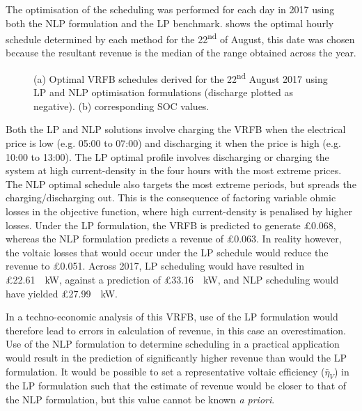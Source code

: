 \documentclass[preprint,3p,review,authoryear,10pt]{elsarticle}
\begin{document}
The optimisation of the scheduling was performed for each day in 2017 using both the NLP formulation and the LP benchmark.  shows the optimal hourly schedule determined by each method for the 22\textsuperscript{nd} of August, this date was chosen because the resultant revenue is the median of the range obtained across the year.

\begin{figure}[!ht]
\centering
{}
\caption{(a) Optimal VRFB schedules derived for the 22\textsuperscript{nd} August 2017 using LP and NLP optimisation formulations (discharge plotted as negative). (b) corresponding SOC values.}
\end{figure}

Both the LP and NLP solutions involve charging the VRFB when the electrical price is low (e.g. 05:00 to 07:00) and discharging it when the price is high (e.g. 10:00 to 13:00). The LP optimal profile involves discharging or charging the system at high current-density in the four hours with the most extreme prices. The NLP optimal schedule also targets the most extreme periods, but spreads the charging/discharging out. This is the consequence of factoring variable ohmic losses in the objective function, where high current-density is penalised by higher losses. Under the LP formulation, the VRFB is predicted to generate \pounds 0.068, whereas the NLP formulation predicts a revenue of \pounds 0.063. In reality however, the voltaic losses that would occur under the LP schedule would reduce the revenue to \pounds 0.051. Across 2017, LP scheduling would have resulted in \pounds \SI{22.61}{\per\kilo\watt}, against a prediction of \pounds \SI{33.16}{\per\kilo\watt}, and NLP scheduling would have yielded \pounds \SI{27.99}{\per\kilo\watt}.

In a techno-economic analysis of this VRFB, use of the LP formulation would therefore lead to errors in calculation of revenue, in this case an overestimation. Use of the NLP formulation to determine scheduling in a practical application would result in the prediction of significantly higher revenue than would the LP formulation. It would be possible to set a representative voltaic efficiency ($\bar\eta_V$) in the LP formulation such that the estimate of revenue would be closer to that of the NLP formulation, but this value cannot be known \textit{a priori}.
\end{document}
